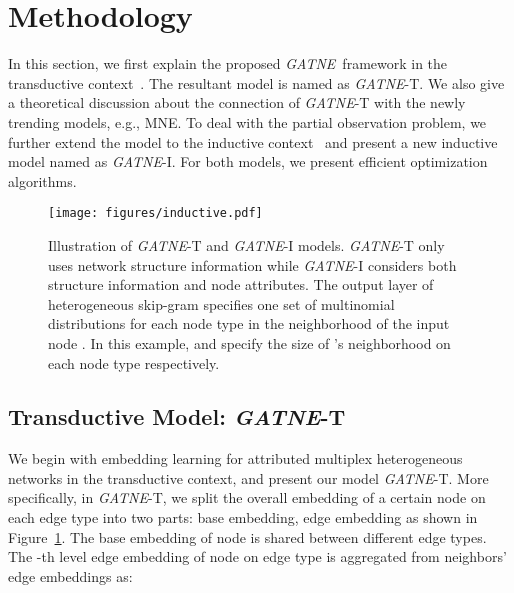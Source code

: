 \documentclass[sigconf]{acmart}
\newcommand{\model}{{\em GATNE}}
\newcommand{\hide}[1]{} \newcommand{\jie}[1]{\textbf{\color{red}[(JT: #1 )]}}  \newcommand{\vpara}[1]{\vspace{0.07in}\noindent\textbf{#1 }}
\begin{document}
 
\section{Methodology}\label{sec:model}


In this section, we first explain the proposed \model\ framework in the transductive context~\cite{kipf2017semi}. The resultant model is named as \model-T.  We also give a theoretical discussion about the connection of  \model-T with the newly trending models, e.g., MNE. To deal with the partial observation problem, we further extend the model to the inductive context~\cite{yang2016revisiting} and present a new inductive model named as \model-I. For both models, we present efficient optimization algorithms.






\begin{figure}[t]
    \centering
    \texttt{[image: figures/inductive.pdf]}
    \caption{Illustration of \model-T and \model-I models. \model-T only uses network structure information while \model-I considers both structure information and node attributes. The output layer of heterogeneous skip-gram specifies one set of multinomial distributions for each node type in the neighborhood of the input node . In this example,  and  specify the size of 's neighborhood on each node type respectively.}
    \label{fig:model}
\end{figure}


\subsection{Transductive Model: \model-T}
\label{sec:trans}

We begin with embedding learning for 
attributed multiplex heterogeneous networks in the transductive context, and present our model \model-T.
More specifically, in \model-T, 
we split the overall embedding of a certain node  on each edge type  into two parts: base embedding, edge embedding as shown in Figure~\ref{fig:model}. The base embedding of node  is shared between different edge types. \hide{The edge embedding of node  is computed by  aggregated embeddings from neighbors for each edge type, where  is the number of edge types of the network. Each edge embedding  on edge type  is computed by the meta embeddings of 's neighbors corresponding to edge type  as: }
The -th level edge embedding  of node  on edge type  is aggregated from neighbors' edge embeddings as:
\end{document}
